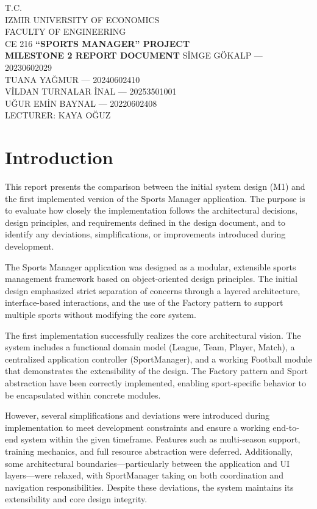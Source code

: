 \documentclass[11pt,a4paper]{article}
\begin{document}
\begin{titlepage}
\thispagestyle{empty}
\centering
\vspace*{2cm}
T.C.\\
IZMIR UNIVERSITY OF ECONOMICS\\
FACULTY OF ENGINEERING\\
CE 216
\vfill
{\Large\bfseries ``SPORTS MANAGER'' PROJECT}\\[0.75em]
{\large\bfseries MILESTONE 2 REPORT DOCUMENT}
\vfill
SİMGE GÖKALP — 20230602029\\[0.45em]
TUANA YAĞMUR — 20240602410\\[0.45em]
VİLDAN TURNALAR İNAL — 20253501001\\[0.45em]
UĞUR EMİN BAYNAL — 20220602408\\[1.25em]
LECTURER: KAYA OĞUZ
\end{titlepage}

\section{Introduction}

This report presents the comparison between the initial system design (M1) and the first implemented version of the Sports Manager application. The purpose is to evaluate how closely the implementation follows the architectural decisions, design principles, and requirements defined in the design document, and to identify any deviations, simplifications, or improvements introduced during development.

The Sports Manager application was designed as a modular, extensible sports management framework based on object-oriented design principles. The initial design emphasized strict separation of concerns through a layered architecture, interface-based interactions, and the use of the Factory pattern to support multiple sports without modifying the core system.

The first implementation successfully realizes the core architectural vision. The system includes a functional domain model (League, Team, Player, Match), a centralized application controller (SportManager), and a working Football module that demonstrates the extensibility of the design. The Factory pattern and Sport abstraction have been correctly implemented, enabling sport-specific behavior to be encapsulated within concrete modules.

However, several simplifications and deviations were introduced during implementation to meet development constraints and ensure a working end-to-end system within the given timeframe. Features such as multi-season support, training mechanics, and full resource abstraction were deferred. Additionally, some architectural boundaries---particularly between the application and UI layers---were relaxed, with SportManager taking on both coordination and navigation responsibilities. Despite these deviations, the system maintains its extensibility and core design integrity.
\end{document}
